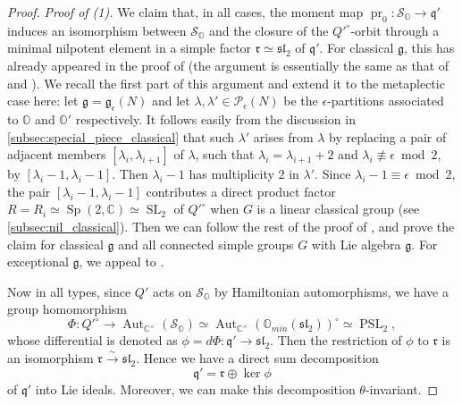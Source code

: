 \documentclass[11pt, a4paper]{amsart}
\newcommand{\C}{\mathbb{C}}
\newcommand{\g}{\mathfrak{g}}
\newcommand{\orb}{\mathbb{O}}
\newcommand{\fg}{\mathfrak{g}}
\newcommand{\cP}{\mathcal{P}}
\newcommand{\cS}{\mathcal{S}}
\DeclareMathOperator{\Aut}{Aut}
\newcommand{\q}{\mathfrak{q}}
\newcommand{\SL}{\operatorname{SL}}
\newcommand{\Sp}{\operatorname{Sp}}
\newcommand{\pr}{\operatorname{pr}}
\newcommand{\cm}{\C^\times}
\newcommand{\rf}{\mathfrak{r}}
\newcommand{\slf}{\mathfrak{sl}}
\newcommand{\PSL}{\operatorname{PSL}}
\newcommand{\Pe}{\cP_\epsilon}
\theoremstyle{definition}
\numberwithin{equation}{section}
\begin{document}
\begin{proof}
	\noindent\emph{Proof of (1).} We claim that, in all cases, the moment map $\pr_0: \cS_\orb \to \mathfrak{q}'$ induces an isomorphism between $\cS_\orb$ and the closure of the $Q'^\circ$-orbit through a minimal nilpotent element in a simple factor $\rf \simeq \slf_2$ of $\mathfrak{q}'$.  %
	For classical $\g$, this has already appeared in the proof of \cite[Proposition 5.12]{MBMY} (the argument is essentially the same as that of \cite[Lemma 4.1]{JLS:Duality} and \cite[Proposition 4.2]{JLS:Duality}). We recall the first part of this argument and extend it to the metaplectic case here: let $\fg=\fg_\epsilon(N)$ and let $\lambda, \lambda' \in \Pe(N)$ be the $\epsilon$-partitions associated to $\orb$ and $\orb'$ respectively. It follows easily from the discussion in \cref{subsec:special_piece_classical} that such $\lambda'$ arises from $\lambda$ by replacing a pair of adjacent members $[\lambda_i, \lambda_{i+1}]$ of $\lambda$, such that $\lambda_i = \lambda_{i+1} + 2$ and $\lambda_i \not\equiv \epsilon \bmod 2$, by $[\lambda_i -1, \lambda_i-1]$. Then $\lambda_i - 1$ has multiplicity $2$ in $\lambda'$. Since $\lambda_i -1 \equiv \epsilon \bmod 2$, the pair $[\lambda_i -1, \lambda_i-1]$ contributes a direct product factor $R = R_i \simeq \Sp(2,\C) \simeq \SL_2$ of $Q'^\circ$ when $G$ is a linear classical group (see \cref{subsec:nil_classical}). Then we can follow the rest of the proof of \cite[Proposition 5.12]{MBMY}, and prove the claim for classical $\g$ and all connected simple groups $G$ with Lie algebra $\g$.
	For exceptional $\g$, we appeal to \cite[Proposition 3.3 and Remark 3.4]{FJLS:generic_sing}.

	Now in all types, since $Q'$ acts on $\cS_{\orb}$ by Hamiltonian automorphisms, we have a group homomorphism 
	\[ \Phi: Q'^\circ \to \Aut_{\cm}(\cS_{\orb}) \simeq \Aut_{\cm}(\orb_{min}(\slf_2))^\circ \simeq \PSL_2, \] 
	whose differential is denoted as $\phi = d\Phi: \q' \to \slf_2$. Then the restriction of $\phi$ to $\rf$ is an isomorphism $\rf \xrightarrow{\sim} \slf_2$. 
	Hence we have a direct sum decomposition 
	\begin{equation} \label{eq:q'_decomp}
		\q' = \rf \oplus \ker \phi 
	\end{equation}
	of $\q'$ into Lie ideals. Moreover, we can make this decomposition $\theta$-invariant. 
	

\end{proof}
\end{document}
